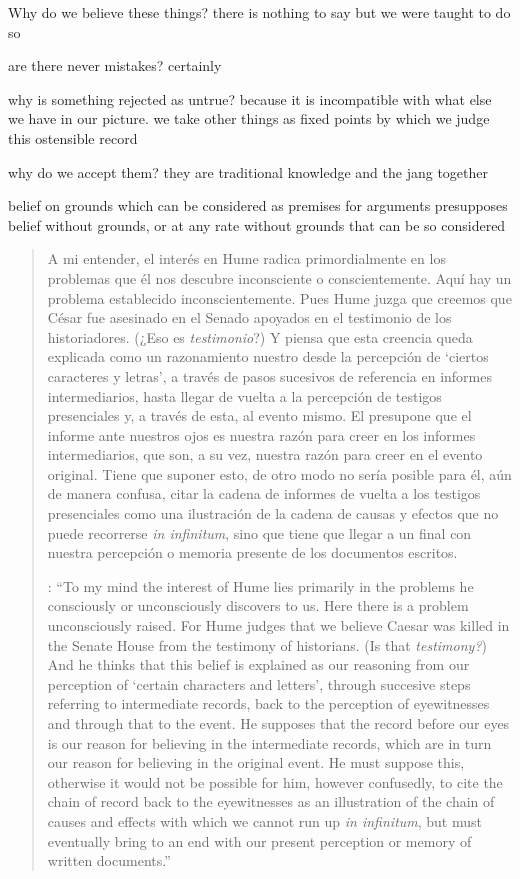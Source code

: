 Why do we believe these things? there is nothing to say but we were taught to do so

are there never mistakes? certainly

why is something rejected as untrue? because it is incompatible with what else we have in our picture. we take other things as fixed points by which we judge this ostensible record

why do we accept them? they are traditional knowledge and the jang together

belief on grounds which can be considered as premises for arguments presupposes belief without grounds, or at any rate without grounds that can be so considered



\blockquote[{\cite[121--122]{anscombe2011plato:humecaus}}: \enquote{To my mind the interest of Hume lies primarily in the problems he consciously or unconsciously discovers to us. Here there is a problem unconsciously raised. For Hume judges that we believe Caesar was killed in the Senate House from the testimony of historians. (Is that \emph{testimony?}) And he thinks that this belief is explained as our reasoning from our perception of `certain characters and letters', through succesive steps referring to intermediate records, back to the perception of eyewitnesses and through that to the event. He supposes that the record before our eyes is our reason for believing in the intermediate records, which are in turn our reason for believing in the original event. He must suppose this, otherwise it would not be possible for him, however confusedly, to cite the chain of record back to the eyewitnesses as an illustration of the chain of causes and effects with which we cannot run up \emph{in infinitum}, but must eventually bring to an end with our present perception or memory of written documents.}]{A mi entender, el interés en Hume radica primordialmente en los problemas que él nos descubre inconsciente o conscientemente. Aquí hay un problema establecido inconscientemente. Pues Hume juzga que creemos que César fue asesinado en el Senado apoyados en el testimonio de los historiadores. (¿Eso es \emph{testimonio}?) Y piensa que esta creencia queda explicada como un razonamiento nuestro desde la percepción de `ciertos caracteres y letras', a través de pasos sucesivos de referencia en informes intermediarios, hasta llegar de vuelta a la percepción de testigos presenciales y, a través de esta, al evento mismo. El presupone que el informe ante nuestros ojos es nuestra razón para creer en los informes intermediarios, que son, a su vez, nuestra razón para creer en el evento original. Tiene que suponer esto, de otro modo no sería posible para él, aún de manera confusa, citar la cadena de informes de vuelta a los testigos presenciales como una ilustración de la cadena de causas y efectos que no puede recorrerse \emph{in infinitum}, sino que tiene que llegar a un final con nuestra percepción o memoria presente de los documentos escritos.}

